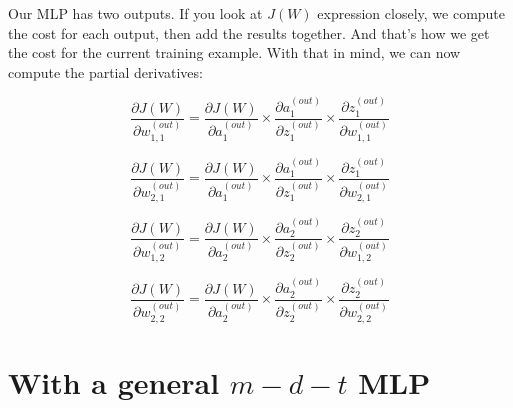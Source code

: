 \documentclass[12pt, letterpaper]{article}
\begin{document}
Our MLP has two outputs. If you look at $J(W)$ expression 
closely, we compute the cost for each output, then add the results
together. And that's how we get the cost for the current training
example. With that in mind, we can now compute the partial
derivatives:

\vspace{5mm} %

\[
    \frac{\partial J(W)}{\partial w_{1,1}^{(out)}} = 
    \frac{\partial J(W)}{\partial a_{1}^{(out)}} \times
    \frac{\partial a_{1}^{(out)}}{\partial z_{1}^{(out)}} \times
    \frac{\partial z_{1}^{(out)}}{\partial w_{1,1}^{(out)}}
\]

\[
    \frac{\partial J(W)}{\partial w_{2,1}^{(out)}} = 
    \frac{\partial J(W)}{\partial a_{1}^{(out)}} \times
    \frac{\partial a_{1}^{(out)}}{\partial z_{1}^{(out)}} \times
    \frac{\partial z_{1}^{(out)}}{\partial w_{2,1}^{(out)}}
\]

\[
    \frac{\partial J(W)}{\partial w_{1,2}^{(out)}} = 
    \frac{\partial J(W)}{\partial a_{2}^{(out)}} \times
    \frac{\partial a_{2}^{(out)}}{\partial z_{2}^{(out)}} \times
    \frac{\partial z_{2}^{(out)}}{\partial w_{1,2}^{(out)}}
\]

\[
    \frac{\partial J(W)}{\partial w_{2,2}^{(out)}} = 
    \frac{\partial J(W)}{\partial a_{2}^{(out)}} \times
    \frac{\partial a_{2}^{(out)}}{\partial z_{2}^{(out)}} \times
    \frac{\partial z_{2}^{(out)}}{\partial w_{2,2}^{(out)}}
\]

\vspace{5mm} %



\section{With a general $m-d-t$ MLP}
\end{document}
